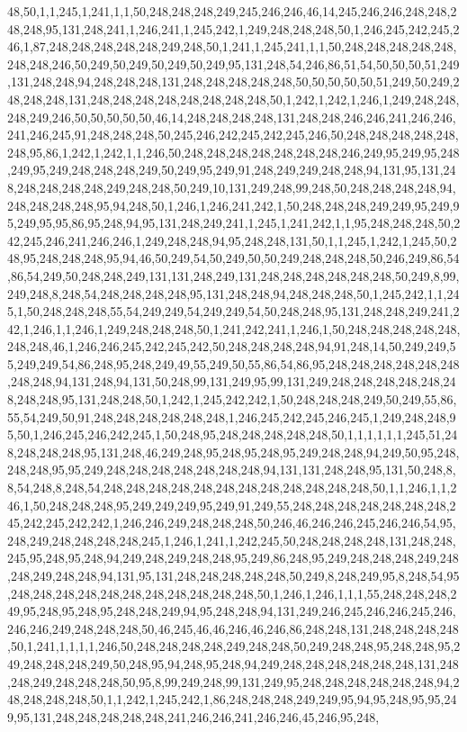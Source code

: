 48,50,1,1,245,1,241,1,1,50,248,248,248,249,245,246,246,46,14,245,246,246,248,248,248,248,95,131,248,241,1,246,241,1,245,242,1,249,248,248,248,50,1,246,245,242,245,246,1,87,248,248,248,248,248,249,248,50,1,241,1,245,241,1,1,50,248,248,248,248,248,248,248,246,50,249,50,249,50,249,50,249,95,131,248,54,246,86,51,54,50,50,50,51,249,131,248,248,94,248,248,248,131,248,248,248,248,248,50,50,50,50,50,51,249,50,249,248,248,248,131,248,248,248,248,248,248,248,248,50,1,242,1,242,1,246,1,249,248,248,248,249,246,50,50,50,50,50,46,14,248,248,248,248,131,248,248,246,246,241,246,246,241,246,245,91,248,248,248,50,245,246,242,245,242,245,246,50,248,248,248,248,248,248,95,86,1,242,1,242,1,1,246,50,248,248,248,248,248,248,248,246,249,95,249,95,248,249,95,249,248,248,248,249,50,249,95,249,91,248,249,249,248,248,94,131,95,131,248,248,248,248,248,249,248,248,50,249,10,131,249,248,99,248,50,248,248,248,248,94,248,248,248,248,95,94,248,50,1,246,1,246,241,242,1,50,248,248,248,249,249,95,249,95,249,95,95,86,95,248,94,95,131,248,249,241,1,245,1,241,242,1,1,95,248,248,248,50,242,245,246,241,246,246,1,249,248,248,94,95,248,248,131,50,1,1,245,1,242,1,245,50,248,95,248,248,248,95,94,46,50,249,54,50,249,50,50,249,248,248,248,50,246,249,86,54,86,54,249,50,248,248,249,131,131,248,249,131,248,248,248,248,248,248,50,249,8,99,249,248,8,248,54,248,248,248,248,95,131,248,248,94,248,248,248,50,1,245,242,1,1,245,1,50,248,248,248,55,54,249,249,54,249,249,54,50,248,248,95,131,248,248,249,241,242,1,246,1,1,246,1,249,248,248,248,50,1,241,242,241,1,246,1,50,248,248,248,248,248,248,248,46,1,246,246,245,242,245,242,50,248,248,248,248,94,91,248,14,50,249,249,55,249,249,54,86,248,95,248,249,49,55,249,50,55,86,54,86,95,248,248,248,248,248,248,248,248,94,131,248,94,131,50,248,99,131,249,95,99,131,249,248,248,248,248,248,248,248,248,95,131,248,248,50,1,242,1,245,242,242,1,50,248,248,248,249,50,249,55,86,55,54,249,50,91,248,248,248,248,248,248,1,246,245,242,245,246,245,1,249,248,248,95,50,1,246,245,246,242,245,1,50,248,95,248,248,248,248,248,50,1,1,1,1,1,1,245,51,248,248,248,248,95,131,248,46,249,248,95,248,95,248,95,249,248,248,94,249,50,95,248,248,248,95,95,249,248,248,248,248,248,248,248,94,131,131,248,248,95,131,50,248,8,8,54,248,8,248,54,248,248,248,248,248,248,248,248,248,248,248,248,50,1,1,246,1,1,246,1,50,248,248,248,95,249,249,249,95,249,91,249,55,248,248,248,248,248,248,248,245,242,245,242,242,1,246,246,249,248,248,248,50,246,46,246,246,245,246,246,54,95,248,249,248,248,248,248,245,1,246,1,241,1,242,245,50,248,248,248,248,131,248,248,245,95,248,95,248,94,249,248,249,248,248,95,249,86,248,95,249,248,248,248,249,248,248,249,248,248,94,131,95,131,248,248,248,248,248,50,249,8,248,249,95,8,248,54,95,248,248,248,248,248,248,248,248,248,248,248,50,1,246,1,246,1,1,1,55,248,248,248,249,95,248,95,248,95,248,248,249,94,95,248,248,94,131,249,246,245,246,246,245,246,246,246,249,248,248,248,50,46,245,46,46,246,46,246,86,248,248,131,248,248,248,248,50,1,241,1,1,1,1,246,50,248,248,248,248,249,248,248,50,249,248,248,95,248,248,95,249,248,248,248,249,50,248,95,94,248,95,248,94,249,248,248,248,248,248,248,131,248,248,249,248,248,248,50,95,8,99,249,248,99,131,249,95,248,248,248,248,248,248,94,248,248,248,248,50,1,1,242,1,245,242,1,86,248,248,248,249,249,95,94,95,248,95,95,249,95,131,248,248,248,248,248,241,246,246,241,246,246,45,246,95,248,